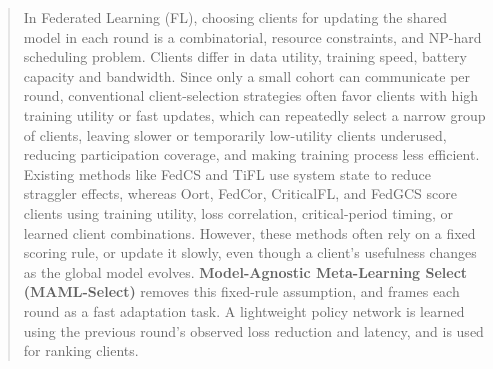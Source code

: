 \documentclass[journal]{IEEEtran}
\theoremstyle{remark}
\newcommand{\revision}[1]{#1}
\begin{document}
\begin{abstract}
\revision{In Federated Learning (FL), choosing clients for updating the shared model in each round is a combinatorial,  resource constraints, and NP-hard scheduling problem. Clients differ in data utility, training speed, battery capacity and bandwidth. Since only a small cohort can communicate per round, conventional client-selection strategies often favor clients with high training utility or fast updates, which  can repeatedly select a narrow group of clients, leaving slower or temporarily low-utility clients underused, reducing participation coverage, and making training process less efficient. Existing methods like FedCS and TiFL use system state to reduce straggler effects, whereas Oort, FedCor, CriticalFL, and FedGCS score clients using training utility, loss correlation, critical-period timing, or learned client combinations. However, these methods often rely on a fixed scoring rule, or update it slowly, even though a client’s usefulness changes as the global model evolves. \textbf{Model-Agnostic Meta-Learning Select (MAML-Select)} removes this fixed-rule assumption, and frames each round as a fast adaptation task. A lightweight policy network is learned using the previous round’s observed loss reduction and latency, and is used for ranking clients. %
}
\end{abstract}
\end{document}
